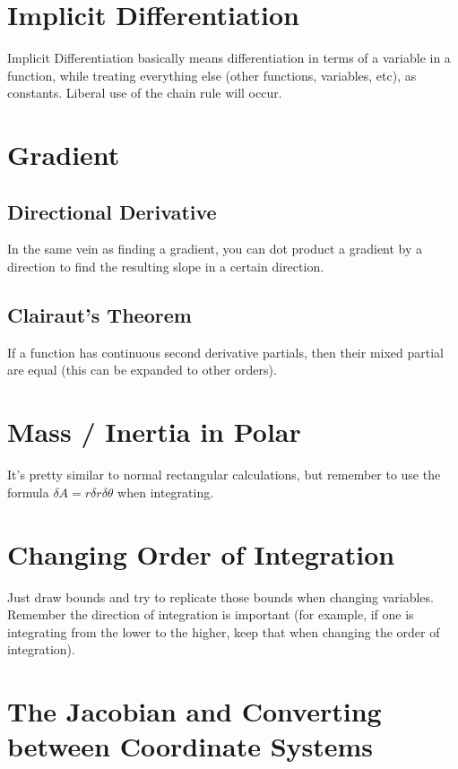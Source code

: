 \documentclass{article}
\begin{document}
\section{Implicit Differentiation}

Implicit Differentiation basically means differentiation in terms of a variable in a function, while treating everything else (other functions, variables, etc), as constants. Liberal use of the chain rule will occur.


\section{Gradient}

\subsection{Directional Derivative}

In the same vein as finding a gradient, you can dot product a gradient by a direction to find the resulting slope in a certain direction.

\subsection{Clairaut's Theorem}

If a function has continuous second derivative partials, then their mixed partial are equal (this can be expanded to other orders).

\section{Mass / Inertia in Polar}

It's pretty similar to normal rectangular calculations, but remember to use the formula $\delta A = r \delta r \delta \theta$ when integrating.


\section{Changing Order of Integration}

Just draw bounds and try to replicate those bounds when changing variables. Remember the direction of integration is important (for example, if one is integrating from the lower to the higher, keep that when changing the order of integration).

\section{The Jacobian and Converting between Coordinate Systems}
\end{document}
